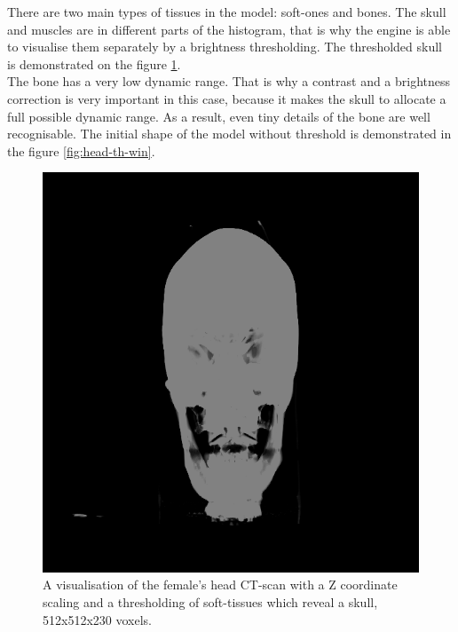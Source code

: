 \documentclass[twoside, english, 11pt]{report}
\begin{document}
There are two main types of tissues in the model: soft-ones and bones. The skull and muscles are in different parts of the histogram, that is why the engine is able to visualise them separately by a brightness thresholding. The thresholded skull is demonstrated on the figure \ref{fig:head-th}.\\

The bone has a very low dynamic range. That is why a contrast and a brightness correction is very important in this case, because it makes the skull to allocate a full possible dynamic range. As a result, even tiny details of the bone are well recognisable. The initial shape of the model without threshold is demonstrated in the figure \ref{fig:head-th-win}. \\

\begin{figure}[H]
\centerline{\includegraphics[scale = 0.45]{img/head-th}}
\caption{A visualisation of the female's head CT-scan with a Z coordinate scaling and a thresholding of soft-tissues which reveal a skull, 512x512x230 voxels.\label{fig:head-th}}
\end{figure}
\end{document}
